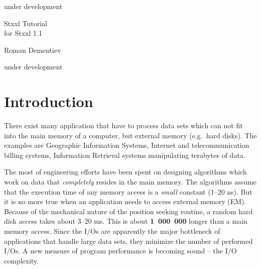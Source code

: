 \documentclass[twoside]{book}
\newcommand{\stxxl}{{\sc Stxxl} }
\begin{document}

%
\setcounter{page}{-2}%
\begin{titlepage}%
under development
\large
\vspace*{1cm}
\vspace*{1cm}
\vspace*{1cm}
\begin{center}
{\huge \stxxl Tutorial}\\

for \stxxl 1.1

\vspace{3mm}

{\LARGE Roman Dementiev\\[2mm]}

\vspace*{\fill}

{\normalsize under development}
\end{center}
\thispagestyle{empty}
\end{titlepage}


\thispagestyle{empty}


\setcounter{tocdepth}{1}
\tableofcontents
\clearpage
{}
\setcounter{page}{1}


\chapter{Introduction}

There exist many application that have to process data sets which
can not fit into the main memory of a computer, but external memory
(e.g.\ hard disks). The examples are Geographic Information
Systems, Internet and telecommunication billing
systems, Information Retrieval systems
manipulating terabytes of data. 

The most of engineering efforts have been spent on designing
algorithms which work on data that \emph{completely} resides in the main
memory. The algorithms assume that the execution time of any
memory access is a \emph{small} constant (1--20 ns). But it is no more
true when 
an application needs to access external memory (EM). Because of the
mechanical nature of the position seeking routine, a random hard disk
access takes about 3--20 ms. This 
is about {\bf 1~000~000} longer than a main memory access. Since the I/Os
are apparently the major bottleneck of applications that handle large
data sets, they minimize the number of performed I/Os.
A new measure of program performance is becoming sound -- the I/O
complexity. 
\end{document}
